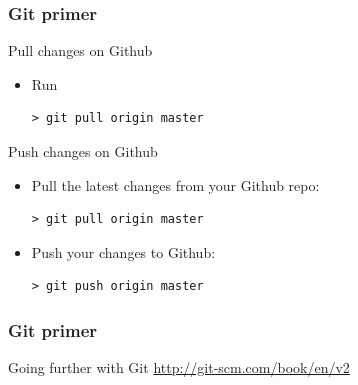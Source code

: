 \documentclass[mathserif, xcolor=dvipsnames]{beamer}
\begin{document}
\begin{frame}[fragile]
    \frametitle{Git primer}
    \begin{block}{Pull changes on Github}
    \begin{itemize}
        \item{Run
\begin{lstlisting}
> git pull origin master
\end{lstlisting}}
    \end{itemize}
    \end{block}

    \begin{block}{Push changes on Github}
    \begin{itemize}
        \item{Pull the latest changes from your Github repo:
\begin{lstlisting}
> git pull origin master
\end{lstlisting}}
        \item{Push your changes to Github:
\begin{lstlisting}
> git push origin master
\end{lstlisting}}
    \end{itemize}
    \end{block}
\end{frame}

\begin{frame}
    \frametitle{Git primer}
    \begin{alertblock}{Going further with Git}
    \url{http://git-scm.com/book/en/v2}
    \end{alertblock}
\end{frame}
\end{document}
